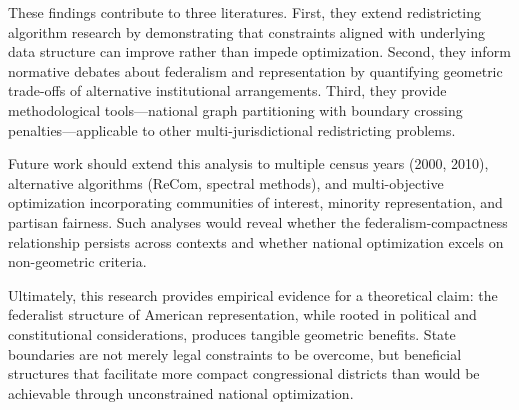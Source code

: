 These findings contribute to three literatures. First, they extend redistricting algorithm research by demonstrating that constraints aligned with underlying data structure can improve rather than impede optimization. Second, they inform normative debates about federalism and representation by quantifying geometric trade-offs of alternative institutional arrangements. Third, they provide methodological tools---national graph partitioning with boundary crossing penalties---applicable to other multi-jurisdictional redistricting problems.

Future work should extend this analysis to multiple census years (2000, 2010), alternative algorithms (ReCom, spectral methods), and multi-objective optimization incorporating communities of interest, minority representation, and partisan fairness. Such analyses would reveal whether the federalism-compactness relationship persists across contexts and whether national optimization excels on non-geometric criteria.

Ultimately, this research provides empirical evidence for a theoretical claim: the federalist structure of American representation, while rooted in political and constitutional considerations, produces tangible geometric benefits. State boundaries are not merely legal constraints to be overcome, but beneficial structures that facilitate more compact congressional districts than would be achievable through unconstrained national optimization.
